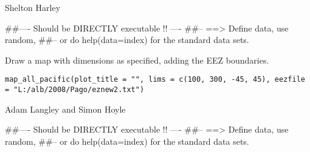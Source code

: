 \documentclass[a4paper]{book}
\begin{document}
%
\begin{Author}\relax

Shelton Harley
\end{Author}
%
\begin{Examples}
\begin{ExampleCode}
##---- Should be DIRECTLY executable !! ----
##-- ==>  Define data, use random,
##--	or do  help(data=index)  for the standard data sets.

\end{ExampleCode}
\end{Examples}
%
\begin{Description}\relax

Draw a map with dimensions as specified, adding the EEZ boundaries. 
\end{Description}
%
\begin{Usage}
\begin{verbatim}
map_all_pacific(plot_title = "", lims = c(100, 300, -45, 45), eezfile = "L:/alb/2008/Pago/eznew2.txt")
\end{verbatim}
\end{Usage}
%
\begin{Arguments}
\begin{ldescription}
\item[\code{plot\_title}] 


\item[\code{lims}] 


\item[\code{eezfile}] 


\end{ldescription}
\end{Arguments}
%
\begin{Author}\relax

Adam Langley and Simon Hoyle
\end{Author}
%
\begin{Examples}
\begin{ExampleCode}
##---- Should be DIRECTLY executable !! ----
##-- ==>  Define data, use random,
##--	or do  help(data=index)  for the standard data sets.

\end{ExampleCode}
\end{Examples}
\end{document}
